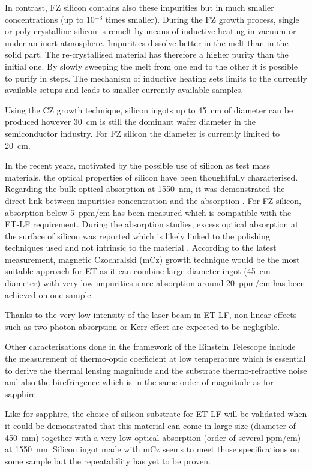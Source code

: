 In contrast, FZ silicon contains also these impurities but in much smaller concentrations (up to 10$^{-3}$ times smaller). During the FZ growth process, single or poly-crystalline silicon is remelt by means of inductive heating in vacuum or under an inert atmosphere. Impurities dissolve better in the melt than in the solid part. The re-crystallised material has therefore a higher purity than the initial one. By slowly sweeping the melt from one end to the other it is possible to purify in steps. The mechanism of inductive heating sets limits to the currently available setups and leads to smaller currently available samples.

Using the CZ growth technique, silicon ingots up to 45~cm of diameter can be produced however 30~cm is still the dominant wafer diameter in the semiconductor industry. For FZ silicon the diameter is currently limited to 20~cm.

In the recent years, motivated by the possible use of silicon as test mass materials, the optical properties of silicon have been thoughtfully characterised. Regarding the bulk optical absorption at 1550~nm, it was demonstrated the direct link between impurities concentration and the absorption \cite{degallaix2013abs_silicon}. For FZ silicon, absorption below 5~ppm/cm has been measured which is compatible with the ET-LF requirement. During the absorption studies, excess optical absorption at the surface of silicon was reported \cite{khalaidovski2013indication} which is likely linked to the polishing techniques used and not intrinsic to the material \cite{bell2017Sisurf}. According to the latest measurement, magnetic Czochralski (mCz) growth technique would be the most suitable approach for ET as it can combine large diameter ingot (45~cm diameter) with very low impurities since absorption around 20~ppm/cm has been achieved on one sample.

Thanks to the very low intensity of the laser beam in ET-LF, non linear effects such as two photon absorption \cite{bristow2007two} or Kerr effect are expected to be negligible.

Other caracterisations done in the framework of the Einstein Telescope include the measurement of thermo-optic coefficient at low temperature \cite{komma2012SithermoOptic} which is essential to derive the thermal lensing magnitude and the substrate thermo-refractive noise and also the birefringence \cite{kruger2015birefringenceSi} which is in the same order of magnitude as for sapphire. 

Like for sapphire, the choice of silicon substrate for ET-LF will be validated when it could be demonstrated that this material can come in large size (diameter of 450~mm) together with a very low optical absorption (order of several ppm/cm) at 1550~nm. Silicon ingot made with mCz seems to meet those specifications on some sample but the repeatability has yet to be proven.

